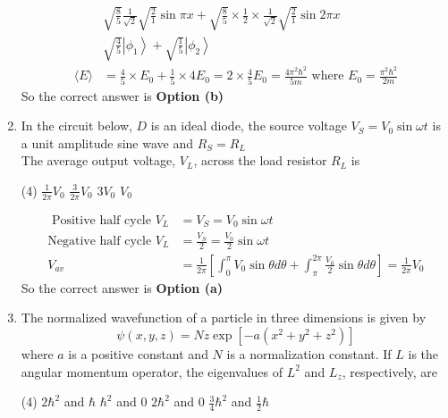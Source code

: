 \begin{enumerate}
\begin{answer}
\begin{align*}
	&\sqrt{\frac{8}{5}} \frac{1}{\sqrt{2}} \sqrt{\frac{2}{1}} \sin \pi x+\sqrt{\frac{8}{5}} \times \frac{1}{2} \times \frac{1}{\sqrt{2}} \sqrt{\frac{2}{1}} \sin 2 \pi x \\
	&\sqrt{\frac{4}{5}}\left|\phi_{1}\right\rangle+\sqrt{\frac{1}{5}}\left|\phi_{2}\right\rangle\\
	\langle E\rangle&=\frac{4}{5} \times E_{0}+\frac{1}{5} \times 4 E_{0}=2 \times \frac{4}{5} E_{0}=\frac{4 \pi^{2} \hbar^{2}}{5 m} \text { where } E_{0}=\frac{\pi^{2} \hbar^{2}}{2 m}
	\end{align*}
			So the correct answer is \textbf{Option (b)}
\end{answer}
\item In the circuit below, $D$ is an ideal diode, the source voltage $V_{S}=V_{0} \sin \omega t$ is a unit amplitude sine wave and $R_{S}=R_{L}$	\\
The average output voltage, $V_{L}$, across the load resistor $R_{L}$ is
 \begin{tasks}(4)
	\task[\textbf{a.}] $\frac{1}{2 \pi} V_{0}$
	\task[\textbf{b.}] $\frac{3}{2 \pi} V_{0}$
	\task[\textbf{c.}]$3 V_{0}$
	\task[\textbf{d.}]$V_{0}$ 
\end{tasks}
\begin{answer}
	\begin{align*}
	\text { Positive half cycle } V_{L}&=V_{S}=V_{0} \sin \omega t\\
	\text{Negative half cycle }V_{L}&=\frac{V_{S}}{2}=\frac{V_{0}}{2} \sin \omega t\\
	V_{a v}&=\frac{1}{2 \pi}\left[\int_{0}^{\pi} V_{0} \sin \theta d \theta+\int_{\pi}^{2 \pi} \frac{V_{0}}{2} \sin \theta d \theta\right]=\frac{1}{2 \pi} V_{0}
	\end{align*}
		So the correct answer is \textbf{Option (a)}
\end{answer}
\item The normalized wavefunction of a particle in three dimensions is given by
$$
\psi(x, y, z)=N z \exp \left[-a\left(x^{2}+y^{2}+z^{2}\right)\right]
$$
where $a$ is a positive constant and $N$ is a normalization constant. If $L$ is the angular momentum operator, the eigenvalues of $L^{2}$ and $L_{z}$, respectively, are
 \begin{tasks}(4)
	\task[\textbf{a.}]$2 \hbar^{2}$ and $\hbar$
	\task[\textbf{b.}]$\hbar^{2}$ and 0
	\task[\textbf{c.}] $2 \hbar^{2}$ and 0
	\task[\textbf{d.}] $\frac{3}{4} \hbar^{2}$ and $\frac{1}{2} \hbar$
\end{tasks}
\begin{answer}

\end{answer}
\end{enumerate}
